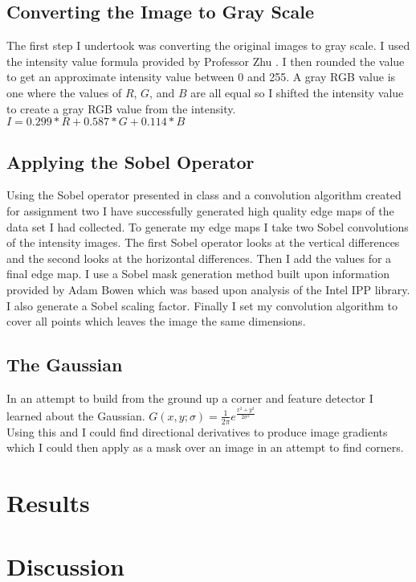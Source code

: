 \documentclass[twocolumn,nofootinbib,%
notitlepage,10pt]{report}
\begin{document}
\subsection{Converting the Image to Gray Scale}
The first step I undertook was converting the original images to gray scale. I used the intensity value formula provided by Professor Zhu \cite{class}. I then rounded the value to get an approximate intensity value between 0 and 255. A gray RGB value is one where the values of $R$, $G$, and $B$ are all equal so I shifted the intensity value to create a gray RGB value from the intensity. \\
$I = 0.299 * R + 0.587 * G + 0.114 * B$

\subsection{Applying the Sobel Operator}
Using the Sobel operator presented in class \cite{class} and a convolution algorithm created for assignment two I have successfully generated high quality edge maps of the data set I had collected. To generate my edge maps I take two Sobel convolutions of the intensity images. The first Sobel operator looks at the vertical differences and the second looks at the horizontal differences. Then I add the values for a final edge map. I use a Sobel mask generation method built upon information provided by Adam Bowen \cite{stack} which was based upon analysis of the Intel IPP library. I also generate a Sobel scaling factor. Finally I set my convolution algorithm to cover all points which leaves the image the same dimensions.\\

\subsection{The Gaussian}
In an attempt to build from the ground up a corner and feature detector I learned about the Gaussian.
$G(x,y;\sigma) = \frac{1}{2\pi}e^{\frac{x^{2}+y^{2}}{2\sigma^{2}}}$\\
Using this and I could find directional derivatives to produce image gradients which I could then apply as a mask over an image in an attempt to find corners.

\section*{Results}

\section*{Discussion}
\end{document}
